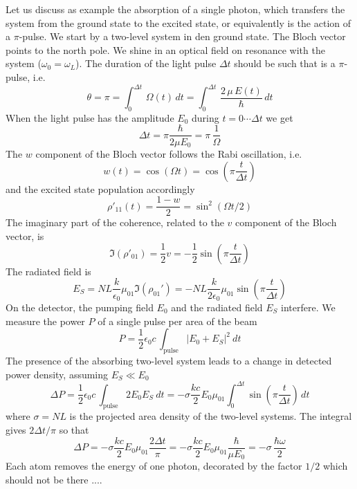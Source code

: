 Let us discuss as example the absorption of a single photon, which transfers the system from the ground state to the excited state, or equivalently is the action of a $\pi$-pulse. We start by a two-level system in den ground state. The Bloch vector points to the north pole. We shine in an optical field on resonance with the system ($\omega_0 = \omega_L$). The duration of the light pulse $\Delta t$ should be such that is a $\pi$-pulse, i.e.
\[
 \theta = \pi = \int_0^{\Delta t} \, \Omega(t) \, dt =  \int_0^{\Delta t} \, \frac{2 \, \mu \, E(t)}{\hbar} \, dt
\]
When the light pulse has the amplitude $E_0$ during $t= 0 \cdots \Delta t$ we get
\[
 \Delta t = \pi \frac{\hbar}{2 \mu E_0}  = \pi \, \frac{1}{\Omega}
\] 
The $w$ component of the Bloch vector follows the Rabi oscillation, i.e.
\[
 w(t) = \cos ( \Omega t  ) = \cos \left( \pi  \frac{t}{\Delta t} \right)
\]
and the excited state population accordingly
\[
 \rho'_{11}(t) = \frac{1 - w}{2}  = \sin^2 ( \Omega t /2 )
\]
The imaginary part of the coherence, related to the $v$ component of the Bloch vector, is
\[
 \Im (\rho'_{01} ) = \frac{1}{2} v =  - \frac{1}{2}  \sin \left( \pi \frac{t}{\Delta t} \right)
\]
The radiated field is 
\[
 E_S  = N L \frac{k }{\epsilon_0}  \mu_{01} \Im (\rho_{01}' ) 
 = - N L \frac{k }{2 \epsilon_0}  \mu_{01} \sin \left( \pi \frac{t}{\Delta t} \right)
\]
On the detector, the pumping field $E_0$ and the radiated field $E_S$ interfere. We measure the power $P$ of a single pulse per area of the beam  
\[
P  = \frac{1}{2} \epsilon_0 c \, \int_\text{pulse} | E_0 + E_S |^2 \ dt
\]
The presence of the absorbing two-level system leads to a change in detected power density, assuming $E_S \ll E_0$
\[
 \Delta P = \frac{1}{2} \epsilon_0 c \,  
\int_\text{pulse} 2 E_0 E_S  \ dt
  =-   \sigma \frac{k c }{2}  E_0 \mu_{01}  \int_0^{\Delta t}   \sin \left( \pi \frac{t}{\Delta t} \right)  \,  dt
\]
where $\sigma = N L $ is the projected area density of the two-level systems. The integral gives $2 \Delta t/\pi$ so that
\[
 \Delta P =-  \sigma \frac{k c}{2}  E_0 \mu_{01} \frac{2 \Delta t}{\pi}
= -  \sigma \frac{k c}{2}  E_0 \mu_{01}  \frac{\hbar}{\mu E_0} 
= -  \sigma \, \frac{ \hbar \omega }{2 }  
\]
Each atom removes the energy of one photon, decorated by the factor $1/2$ which should not be there ....

\printbibliography[segment=\therefsegment,heading=subbibliography]
